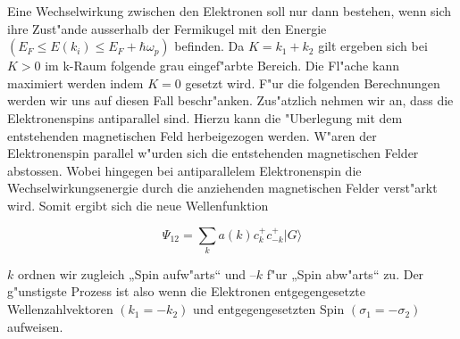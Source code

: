 \begin{refsection}
Eine Wechselwirkung zwischen den Elektronen soll nur dann bestehen, wenn sich ihre Zust"ande ausserhalb der Fermikugel mit den Energie $(E_F \le E(k_i) \le E_F+\hbar\omega_p)$ befinden. Da $K=k_1+k_2$ gilt ergeben sich bei $K>0$ im k-Raum folgende grau eingef"arbte Bereich. Die Fl"ache kann maximiert werden indem $K=0$ gesetzt wird. F"ur die folgenden Berechnungen werden wir uns auf diesen Fall beschr"anken.
Zus"atzlich nehmen wir an, dass die Elektronenspins antiparallel sind. Hierzu kann die "Uberlegung mit dem entstehenden magnetischen Feld herbeigezogen werden. W"aren der Elektronenspin parallel w"urden sich die entstehenden magnetischen Felder abstossen. Wobei hingegen bei antiparallelem Elektronenspin die Wechselwirkungsenergie durch die anziehenden magnetischen Felder verst"arkt wird.
Somit ergibt sich die neue Wellenfunktion

\[
\Psi_{12}=\sum \limits_{k} a(k)c^+_{k}c^+_{-k}|G\rangle
\]

$k$ ordnen wir zugleich „Spin aufw"arts“ und $–k$ f"ur „Spin abw"arts“ zu.
Der g"unstigste Prozess ist also wenn die Elektronen entgegengesetzte Wellenzahlvektoren $(k_1 = -k_2)$ und entgegengesetzten Spin $(\sigma_1 = -\sigma_2)$ aufweisen.
\\
\\
\printbibliography[heading=subbibliography]
\end{refsection}

